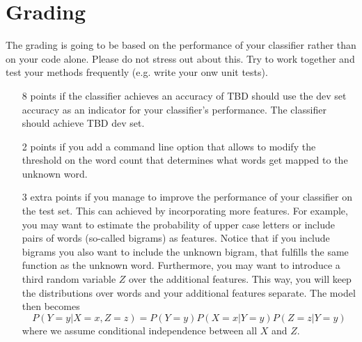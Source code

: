 \documentclass[11pt, leqno, a4paper]{article}
\begin{document}
\section{Grading}
The grading is going to be based on the performance of your classifier rather
than on your code alone. Please do not stress out about this. Try to work
together and test your methods frequently (e.g. write your onw unit tests).
\begin{itemize}
\item[8 points] if the classifier achieves an accuracy of TBD%
should use the dev set accuracy as an indicator for your classifier’s
performance. The classifier should achieve TBD%
dev set.
\item[2 points] if you add a command line option that allows to modify the threshold
on the word count that determines what words get mapped to the
unknown word.
\item[3 extra points] if you manage to improve the performance of your classifier on the test
set. This can achieved by incorporating more features. For example,
you may want to estimate the probability of upper case letters or
include pairs of words (so-called bigrams) as features. Notice that if
you include bigrams you also want to include the unknown bigram,
that fulfills the same function as the unknown word. Furthermore, you may want to introduce
a third random variable $ Z $ over the additional features. This way, you will keep the 
distributions over words and your additional features separate. The model then becomes
$$ P(Y=y|X=x,Z=z) = P(Y=y)P(X=x|Y=y)P(Z=z|Y=y) $$ where we assume conditional independence between
all $ X $ and $ Z $.
\end{itemize}
\end{document}
